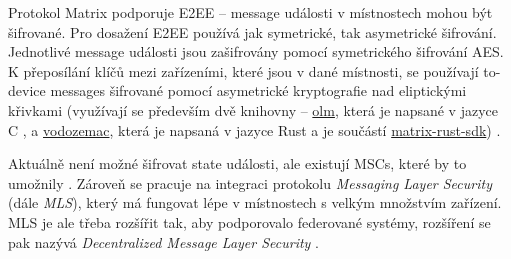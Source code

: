 Protokol Matrix podporuje E2EE -- message události v místnostech mohou být
šifrované. Pro dosažení E2EE používá jak symetrické, tak asymetrické šifrování.
Jednotlivé message události jsou zašifrovány pomocí symetrického šifrování AES.
K přeposílání klíčů mezi zařízeními, které jsou v dané místnosti, se používají
to-device messages šifrované pomocí asymetrické kryptografie nad
eliptickými křivkami (využívají se především dvě knihovny --
\href{https://gitlab.matrix.org/matrix-org/olm}{olm}, která je napsané v jazyce
C \cite{GitLab-Olm}, a
\href{https://github.com/matrix-org/vodozemac}{vodozemac}, která je napsaná v
jazyce Rust a je součástí
\href{https://github.com/matrix-org/matrix-rust-sdk}{matrix-rust-sdk})
\cite{GitHub-MatrixRustSDK}.

Aktuálně není možné šifrovat state události, ale existují MSCs, které by to
umožnily \cite{GitHub-MSC3414}. Zároveň se pracuje na integraci protokolu
\textit{Messaging Layer Security} (dále \textit{MLS}), který má fungovat lépe v
místnostech s velkým množstvím zařízení. MLS je ale třeba rozšířit tak, aby
podporovalo federované systémy, rozšíření se pak nazývá \textit{Decentralized
    Message Layer Security} \cite{AreWeMLSYet}.
